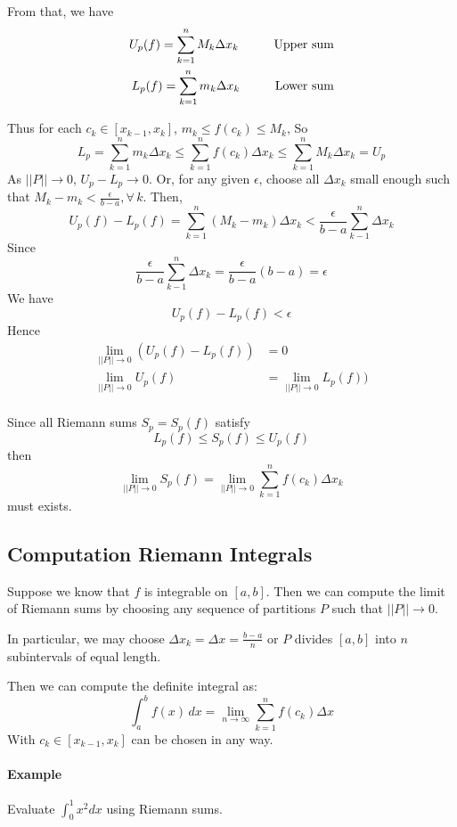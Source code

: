 \documentclass[12pt]{article}
\newcommand\tab[1][1cm]{\hspace*{#1}}
\begin{document}
From that, we have
\begin{align*} 
    U_p(f) = \sum_{k = 1}^n M_k \Delta x_k \textrm{\tab Upper sum}\\
    L_p(f) = \sum_{k = 1}^n m_k \Delta x_k \textrm{\tab Lower sum}
\end{align*}

Thus for each $c_k \in [x_{k - 1}, x_k]$, $m_k \leq f(c_k) \leq M_k$, So
\[
    L_p = \sum_{k = 1}^n m_k \Delta x_k \leq \sum_{k = 1}^n f(c_k) \Delta x_k \leq \sum_{k = 1}^n M_k \Delta x_k = U_p
\]
As $||P|| \to 0$, $U_p - L_p \to 0$. Or, for any given $\epsilon$, choose all 
$\Delta x_k $ small enough such that $M_k - m_k < \frac{\epsilon}{b - a}, \forall \, k$. Then,
\[
    U_p(f) - L_p(f) = \sum_{k = 1}^n (M_k - m_k) \Delta x_k < \frac{\epsilon}{b - a} \sum_{k - 1}^n \Delta x_k
\]
Since
\[
    \frac{\epsilon}{b - a} \sum_{k - 1}^n \Delta x_k = \frac{\epsilon}{b - a}(b - a) = \epsilon
\]
We have
\[
    U_p(f) - L_p(f) < \epsilon    
\]
Hence
\begin{align*} 
     \lim_{||P|| \to 0} (U_p(f) - L_p(f)) &= 0 \\
     \lim_{||P|| \to 0} U_p(f) &= \lim_{||P|| \to 0} L_p(f))  \\
\end{align*}

\noindent
Since all Riemann sums $S_p = S_p(f)$ satisfy
\[
    L_p(f) \leq S_p(f) \leq U_p(f)
\]
then
\[
    \lim_{||P|| \to 0} S_p(f) = \lim_{||P|| \to 0} \sum_{k = 1}^n f(c_k)\Delta x_k
\]
must exists.

\subsection{Computation Riemann Integrals}
Suppose we know that $f$ is integrable on $[a, b]$. Then we can compute the limit of Riemann sums by choosing any sequence of partitions
$P$ such that $||P|| \to 0$.

In particular, we may choose $\Delta x_k = \Delta x = \frac{b - a}{n}$ or $P$ divides
$[a, b]$ into $n$ subintervals of equal length.

Then we can compute the definite integral as:
\[
    \int_a^b f(x) \, dx = \lim_{n \to \infty} \sum_{k = 1}^n f(c_k) \Delta x
\]
With $c_k \in [x_{k-1}, x_k]$ can be chosen in any way.

\paragraph{Example} Evaluate $\int_0^1 x^2 dx$ using Riemann sums.
\end{document}
